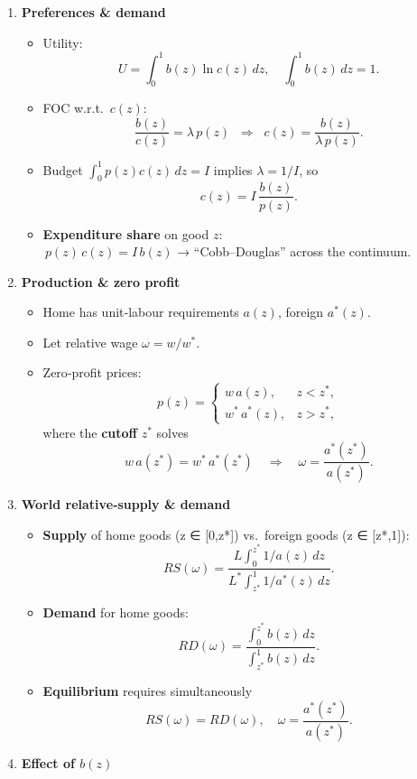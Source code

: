 \documentclass[
]{article}
\providecommand{\tightlist}{%
  \setlength{\itemsep}{0pt}\setlength{\parskip}{0pt}}
\begin{document}
\begin{enumerate}
\def\labelenumi{\arabic{enumi}.}
\tightlist
\item
  \textbf{Preferences \& demand}

  \begin{itemize}
  \tightlist
  \item
    Utility:\\
    \[
      U=\int_{0}^{1}b(z)\ln c(z)\,dz,\quad \int_{0}^{1}b(z)\,dz=1.
    \]
  \item
    FOC w.r.t.~\(c(z)\):\\
    \[
      \frac{b(z)}{c(z)}=\lambda\,p(z)
      \;\;\Longrightarrow\;\;
      c(z)=\frac{b(z)}{\lambda\,p(z)}.
    \]
  \item
    Budget \(\int_{0}^{1}p(z)c(z)\,dz=I\) implies \(\lambda=1/I\), so \[
      c(z)=I\,\frac{b(z)}{p(z)}.
    \]
  \item
    \textbf{Expenditure share} on good \(z\):\\
    \(\,p(z)\,c(z)=I\,b(z)\) → ``Cobb--Douglas'' across the continuum.
  \end{itemize}
\item
  \textbf{Production \& zero profit}

  \begin{itemize}
  \tightlist
  \item
    Home has unit‐labour requirements \(a(z)\), foreign \(a^*(z)\).\\
  \item
    Let relative wage \(\omega=w/w^*\).\\
  \item
    Zero‐profit prices: \[
      p(z)=
      \begin{cases}
        w\,a(z),& z<z^*,\\
        w^*\,a^*(z),& z>z^*,
      \end{cases}
    \] where the \textbf{cutoff} \(z^*\) solves \[
      w\,a(z^*)=w^*\,a^*(z^*)
      \quad\Longrightarrow\quad
      \omega=\frac{a^*(z^*)}{a(z^*)}.
    \]
  \end{itemize}
\item
  \textbf{World relative‐supply \& demand}

  \begin{itemize}
  \tightlist
  \item
    \textbf{Supply} of home goods (z ∈ {[}0,z*{]}) vs.~foreign goods (z
    ∈ {[}z*,1{]}):\\
    \[
      RS(\omega)
      =\frac{L\int_{0}^{z^*}\!1/a(z)\,dz}
            {L^*\int_{z^*}^{1}\!1/a^*(z)\,dz}.
    \]
  \item
    \textbf{Demand} for home goods: \[
      RD(\omega)
      =\frac{\displaystyle\int_{0}^{z^*}\!b(z)\,dz}
            {\displaystyle\int_{z^*}^{1}\!b(z)\,dz}.
    \]
  \item
    \textbf{Equilibrium} requires simultaneously \[
      RS(\omega)=RD(\omega),
      \quad
      \omega=\frac{a^*(z^*)}{a(z^*)}.
    \]
  \end{itemize}
\item
  \textbf{Effect of \(b(z)\)}


\end{enumerate}
\end{document}
